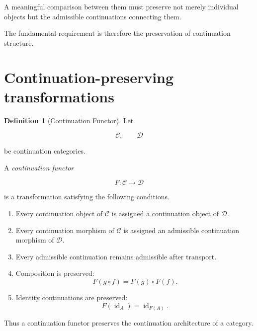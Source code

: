 \documentclass[13pt,openany]{book}
\theoremstyle{plain}
\theoremstyle{definition}
\newtheorem{definition}{Definition}[chapter]
\begin{document}
A meaningful comparison between them must preserve not merely individual
objects but the admissible continuations connecting them.

The fundamental requirement is therefore the preservation of continuation
structure.

\section{Continuation-preserving transformations}

\begin{definition}[Continuation Functor]

Let

\[
\mathcal C,
\qquad
\mathcal D
\]

be continuation categories.

A \emph{continuation functor}

\[
F:\mathcal C\longrightarrow\mathcal D
\]

is a transformation satisfying the following conditions.

\begin{enumerate}

\item Every continuation object of $\mathcal C$ is assigned a continuation
object of $\mathcal D$.

\item Every continuation morphism of $\mathcal C$ is assigned an admissible
continuation morphism of $\mathcal D$.

\item Every admissible continuation remains admissible after transport.

\item Composition is preserved:
\[
F(g\circ f)
=
F(g)\circ F(f).
\]

\item Identity continuations are preserved:
\[
F(\operatorname{id}_A)
=
\operatorname{id}_{F(A)}.
\]

\end{enumerate}

\end{definition}

Thus a continuation functor preserves the continuation architecture of a
category.

\end{document}
